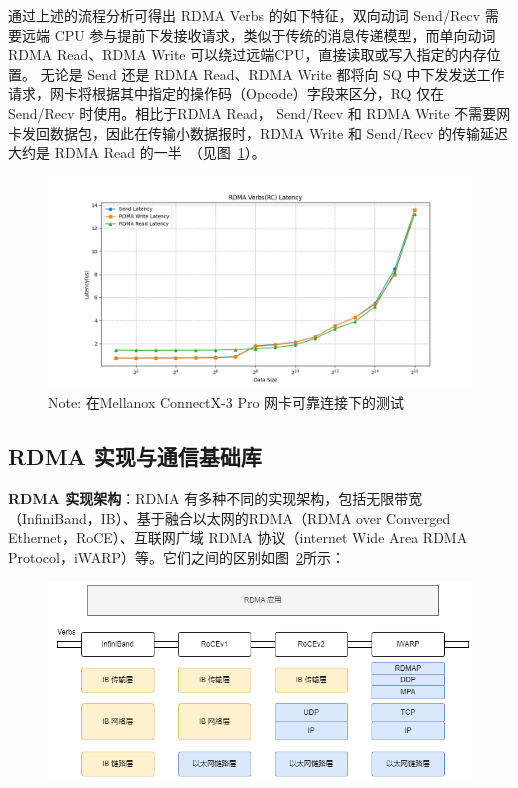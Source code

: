 {    通过上述的流程分析可得出 RDMA Verbs 的如下特征，双向动词 Send/Recv 需要远端 CPU 参与提前下发接收请求，类似于传统的消息传递模型，而单向动词 RDMA Read、RDMA Write 可以绕过远端CPU，直接读取或写入指定的内存位置。
    无论是 Send 还是 RDMA Read、RDMA Write 都将向 SQ 中下发发送工作请求，网卡将根据其中指定的操作码（Opcode）字段来区分，RQ 仅在 Send/Recv 时使用。相比于RDMA Read， Send/Recv 和 RDMA Write 不需要网卡发回数据包，因此在传输小数据报时，RDMA Write 和 Send/Recv 的传输延迟大约是 RDMA Read 的一半~\citep{kalia2014herd}（见图~\ref{fig:RDMA-Verbs-Latency}）。
    \begin{figure}[!htbp]
        \centering
        \includegraphics[width=\linewidth]{Img/verbs-latency.png}
        {\small Note: 在Mellanox ConnectX-3 Pro 网卡可靠连接下的测试}
        \label{fig:RDMA-Verbs-Latency}
    \end{figure}

    \subsection{RDMA 实现与通信基础库}
    \textbf{RDMA 实现架构}：RDMA 有多种不同的实现架构，包括无限带宽（InfiniBand，IB）、基于融合以太网的RDMA（RDMA over Converged Ethernet，RoCE）、互联网广域 RDMA 协议（internet Wide Area RDMA Protocol，iWARP）等。它们之间的区别如图~\ref{fig:RDMA-Implementations}所示：
    \begin{figure}[!htbp]
        \centering
        \includegraphics[width=\linewidth]{Img/RDMA-Implementation.png}
        \label{fig:RDMA-Implementations}
    \end{figure}

}
